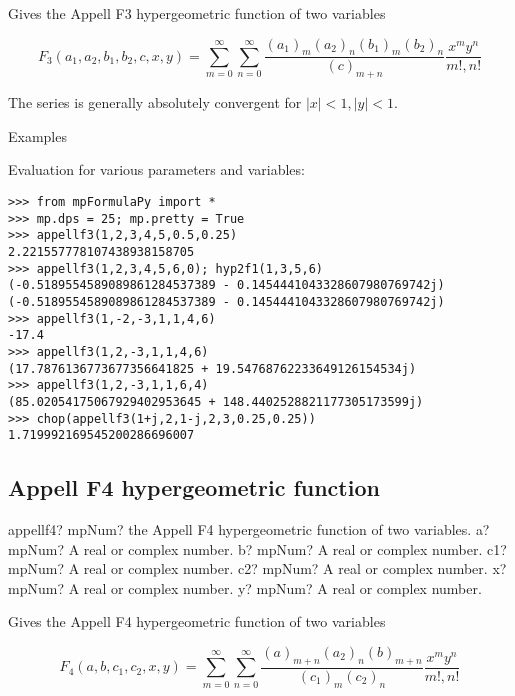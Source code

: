 \vpara
Gives the Appell F3 hypergeometric function of two variables

\begin{equation}
F_3(a_1,a_2,b_1,b_2,c,x,y) = \sum_{m=0}^{\infty} \sum_{n=0}^{\infty} \frac{(a_1)_{m}(a_2)_{n}(b_1)_m (b_2)_n}{(c)_{m+n}} \frac{x^my^n}{m!,n!}
\end{equation}


The series is generally absolutely convergent for $|x|<1, |y|<1$.

Examples

Evaluation for various parameters and variables:

\begin{lstlisting}
>>> from mpFormulaPy import *
>>> mp.dps = 25; mp.pretty = True
>>> appellf3(1,2,3,4,5,0.5,0.25)
2.221557778107438938158705
>>> appellf3(1,2,3,4,5,6,0); hyp2f1(1,3,5,6)
(-0.5189554589089861284537389 - 0.1454441043328607980769742j)
(-0.5189554589089861284537389 - 0.1454441043328607980769742j)
>>> appellf3(1,-2,-3,1,1,4,6)
-17.4
>>> appellf3(1,2,-3,1,1,4,6)
(17.7876136773677356641825 + 19.54768762233649126154534j)
>>> appellf3(1,2,-3,1,1,6,4)
(85.02054175067929402953645 + 148.4402528821177305173599j)
>>> chop(appellf3(1+j,2,1-j,2,3,0.25,0.25))
1.719992169545200286696007
\end{lstlisting}




\subsection{Appell F4 hypergeometric function}

\begin{mpFunctionsExtract}
	\mpFunctionSix
	{appellf4? mpNum? the Appell F4 hypergeometric function of two variables.}
	{a? mpNum? A real or complex number.}
	{b? mpNum? A real or complex number.}	
	{c1? mpNum? A real or complex number.}
	{c2? mpNum? A real or complex number.}	
	{x? mpNum? A real or complex number.}		
	{y? mpNum? A real or complex number.}		
\end{mpFunctionsExtract}

\vpara
Gives the Appell F4 hypergeometric function of two variables

\begin{equation}
F_4(a,b,c_1,c_2,x,y) = \sum_{m=0}^{\infty} \sum_{n=0}^{\infty} \frac{(a)_{m+n}(a_2)_{n}(b)_{m+n}}{(c_1)_m (c_2)_n} \frac{x^my^n}{m!,n!}
\end{equation} 


